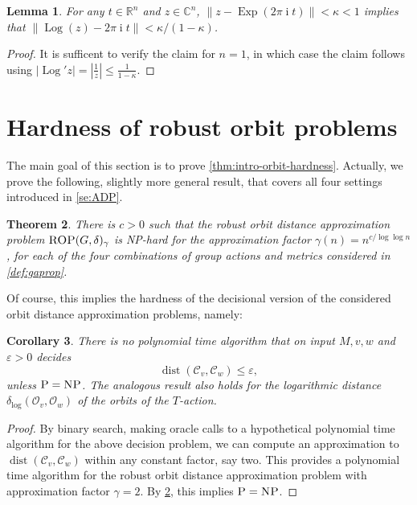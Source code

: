 \documentclass[10pt,a4paper]{article}
\newtheorem{theorem}{Theorem}[section]
\newtheorem{lemma}[theorem]{Lemma}
\newtheorem{corollary}[theorem]{Corollary}
\theoremstyle{definition}
\DeclareMathOperator{\ii}{i}
\DeclareMathOperator{\Log}{Log}
\DeclareMathOperator{\Exp}{Exp}
\DeclareMathOperator{\dist}{dist}
\newcommand{\distLD}{\delta_{\log}}
\newcommand{\CC}{\mathbb{C}}
\newcommand{\RR}{\mathbb{R}}
\newcommand{\OO}{\ensuremath{\mathcal{O}}}
\newcommand{\KK}{\ensuremath{\mathcal{C}}}
\numberwithin{equation}{section}
\begin{document}

\begin{lemma}\label{le:Lipsch-log}
For any $t\in\RR^n$ and $z\in\CC^n$,
$\|z- \Exp(2\pi\ii t)\| < \kappa<1$ implies that
$\|\Log(z)- 2\pi\ii t \| < \kappa/(1-\kappa)$.
\end{lemma}

\begin{proof}
It is sufficent to verify the claim for $n=1$, in which case the claim follows using $|\Log' z| = |\frac{1}{z}| \le \frac{1}{1-\kappa}$.
\end{proof}


\section{Hardness of robust orbit problems} \label{sec:hardness}

The main goal of this section is to prove \cref{thm:intro-orbit-hardness}.
Actually, we prove the following, slightly more general result,
that covers all four settings introduced in \cref{se:ADP}.

\begin{theorem}
\label{thm:rop-is-hard}
There is $c>0$ such that the robust orbit distance approximation problem
$\textsc{ROP}(G,\delta)_{\gamma}$ is \textsc{NP}-hard for the approximation
factor $\gamma(n)= n^{c/\log\log n}$,
for each of the four combinations of group actions and metrics
considered in \cref{def:gaprop}.
\end{theorem}

Of course, this implies the hardness of the decisional version of the considered orbit distance approximation problems, namely:

\begin{corollary}
There is no polynomial time algorithm that on input $M,v,w$ and $\varepsilon > 0$ decides
\[
	\dist(\KK_v,\KK_w)\leq \varepsilon,
\]
unless $\textsc{P}=\textsc{NP}$. The analogous result also holds
for the logarithmic distance
$\distLD(\OO_v,\OO_w)$ of the orbits of the $T$-action.
\end{corollary}

\begin{proof}
By binary search, making oracle calls to a hypothetical polynomial time algorithm for the above
decision problem, we can compute an approximation to $\dist(\KK_v,\KK_w)$ within any constant factor, say two.
This provides a polynomial time algorithm for
the robust orbit distance approximation problem
with approximation factor $\gamma=2$.
By \cref{thm:rop-is-hard}, this implies $\textsc{P}=\textsc{NP}$.
\end{proof}
\end{document}
